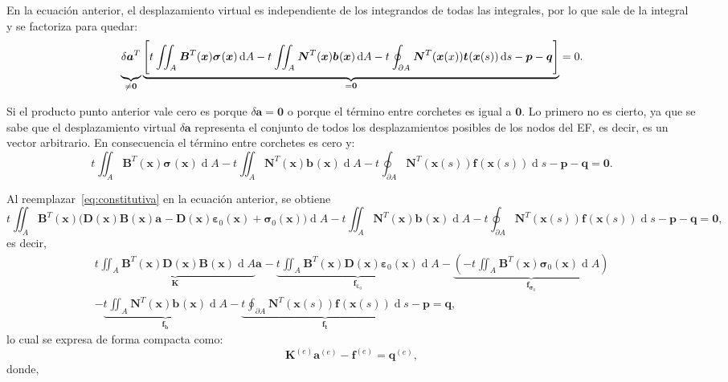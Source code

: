 \documentclass[12pt,letterpaper, landscape]{article}
\newcommand{\e}{{}}
\newcommand{\ve}[1]{{\boldsymbol{#1}}}
\newcommand{\ma}[1]{{\boldsymbol{#1}}}
\newcommand{\dd}{\operatorname{d} \!}
\begin{document}
En la ecuación anterior, el desplazamiento virtual es independiente de los integrandos de todas las integrales, por lo que sale de la integral y se factoriza para quedar:
\begin{equation}
\underbrace{\vphantom{\Bigg[}\delta\ve{a}^T}_{\neq\ve{0}} \underbrace{\Bigg[ t^\e \iint_{A^\e} \ma{B}^T(\ve{x}) \ve{\sigma}^\e(\ve{x}) \dd A - t^\e \iint_{A^\e}  \ma{N}^T(\ve{x}) \ve{b}^\e(\ve{x}) \dd A - t^\e \oint_{\partial A^\e} \ma{N}^T(\ve{x}(x)) \ve{t}^\e(\ve{x}(s)) \dd s - \ve{p} - \ve{q} \Bigg]}_{=\ve{0}}= 0. \label{eq:PTV3}
\end{equation}

Si el producto punto anterior vale cero es porque $\delta\ve{a} = \ve{0}$ o porque el término entre corchetes es igual a $\ve{0}$. Lo primero no es cierto, ya que se sabe que el desplazamiento virtual $\delta \ve{a}$ representa el conjunto de todos los desplazamientos posibles de los nodos del EF, es decir, es un vector arbitrario. En consecuencia el término entre corchetes es cero y:
\begin{equation}
 t^\e \iint_{A^\e}  \ma{B}^T(\ve{x})  \ve{\sigma}^\e(\ve{x}) \dd A - t^\e \iint_{A^\e}  \ma{N}^T(\ve{x}) \ve{b}^\e(\ve{x}) \dd A -  t^\e \oint_{\partial A^\e} \ma{N}^T(\ve{x}(s)) \ve{f}^\e(\ve{x}(s)) \dd s -  \ve{p} - \ve{q} = \ve{0}.
\end{equation}

Al reemplazar~\eqref{eq:constitutiva} en la ecuación anterior, se obtiene
\begin{equation}
t^\e \iint_{A^\e}  \ma{B}^T(\ve{x}) \big(\ma{D}(\ve{x})\ma{B}(\ve{x})\ve{a}^\e - \ma{D}(\ve{x})\ve{\varepsilon}_0(\ve{x}) + \ve{\sigma}_0(\ve{x})\big) \dd A 
- t^\e \iint_{A^\e}  \ma{N}^T(\ve{x}) \ve{b}^\e(\ve{x}) \dd A -  t^\e \oint_{\partial A^\e} \ma{N}^T(\ve{x}(s)) \ve{f}^\e(\ve{x}(s)) \dd s -  \ve{p} - \ve{q} = \ve{0},
\end{equation}
es decir,
\begin{multline}
\underbrace{t^\e \iint_{A^\e}  \ma{B}^T(\ve{x})\ma{D}(\ve{x})\ma{B}(\ve{x}) \dd A}_{\ma{K}} \ve{a}^\e
% 
- \underbrace{t^\e \iint_{A^\e}  \ma{B}^T(\ve{x})\ma{D}(\ve{x})\ve{\varepsilon}_0(\ve{x}) \dd A}_{\ve{f}_{\ve{\varepsilon}_0}} 
%
- \underbrace{\left(-t^\e \iint_{A^\e}  \ma{B}^T(\ve{x})\ve{\sigma}_0(\ve{x}) \dd A \right)}_{\ve{f}_{\ve{\sigma}_0}} \\
%
- \underbrace{t^\e \iint_{A^\e}  \ma{N}^T(\ve{x}) \ve{b}^\e(\ve{x}) \dd A}_{\ve{f}_\ve{b}}
%
- \underbrace{t^\e \oint_{\partial A^\e} \ma{N}^T(\ve{x}(s)) \ve{f}^\e(\ve{x}(s)) \dd s}_{\ve{f}_\ve{t}} 
%
- \ve{p} = \ve{q},
\end{multline}
lo cual se expresa de forma compacta como:
\begin{equation}
\ma{K}^{(e)} \ve{a}^{(e)} - \ma{f}^{(e)} = \ma{q}^{(e)},
\end{equation}
donde,
\end{document}
